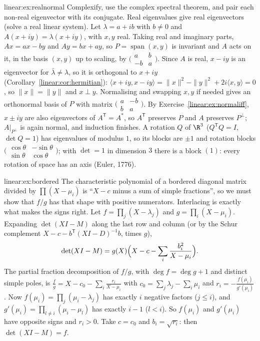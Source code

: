 \begin{solution}{linear:ex:realnormal}
\idea Complexify, use the complex spectral theorem, and pair each non-real eigenvector with its conjugate.
\writeup Real eigenvalues give real eigenvectors (solve a real linear system). Let $\lambda=a+ib$ with $b\ne0$ and
$A(x+iy)=\lambda(x+iy)$, with $x,y$ real. Taking real and imaginary parts, $Ax=ax-by$ and $Ay=bx+ay$, so $P=\operatorname{span}
(x,y)$ is invariant and $A$ acts on it, in the basis $(x,y)$ up to scaling, by $\bigl(\begin{smallmatrix}a&b\\-b&a
\end{smallmatrix}\bigr)$. Since $A$ is real, $x-iy$ is an eigenvector for $\bar\lambda\ne\lambda$, so it is orthogonal to
$x+iy$ (Corollary~\ref{linear:cor:hermitian}): $\langle x+iy,x-iy\rangle=\|x\|^2-\|y\|^2+2i\langle x,y\rangle=0$, so $\|x\|=\|y\|$
and $x\perp y$. Normalising and swapping $x,y$ if needed gives an orthonormal basis of $P$ with matrix $\bigl(\begin{smallmatrix}
a&-b\\b&a\end{smallmatrix}\bigr)$. By Exercise~\ref{linear:ex:normaliff}, $x\pm iy$ are also eigenvectors of $A^{\mathsf T}=A^*$, so
$A^{\mathsf T}$ preserves $P$ and $A$ preserves $P^\perp$; $A|_{P^\perp}$ is again normal, and induction finishes. A rotation
$Q$ of $\R^3$ ($Q^{\mathsf T}Q=I$, $\det Q=1$) has eigenvalues of modulus $1$, so its blocks are $\pm1$ and rotation blocks
$\bigl(\begin{smallmatrix}\cos\theta&-\sin\theta\\\sin\theta&\cos\theta\end{smallmatrix}\bigr)$; with $\det=1$ in dimension $3$
there is a block $(1)$: every rotation of space has an axis (Euler, 1776).
\end{solution}

\begin{solution}{linear:ex:bordered}
\idea The characteristic polynomial of a bordered diagonal matrix divided by $\prod(X-\mu_i)$ is ``$X-c$ minus a sum of
simple fractions'', so we must show that $f/g$ has that shape with positive numerators. Interlacing is exactly what makes the
signs right.
\writeup Let $f=\prod_j(X-\lambda_j)$ and $g=\prod_i(X-\mu_i)$. Expanding $\det(XI-M)$ along the last row and column (or by
the Schur complement $X-c-b^{\mathsf T}(XI-D)^{-1}b$, times $g$),
\[
\det(XI-M)=g(X)\Bigl(X-c-\sum_i\frac{b_i^2}{X-\mu_i}\Bigr).
\]
The partial fraction decomposition of $f/g$, with $\deg f=\deg g+1$ and distinct simple poles, is
$\frac fg=X-c_0-\sum_i\frac{r_i}{X-\mu_i}$ with $c_0=\sum_j\lambda_j-\sum_i\mu_i$ and $r_i=-\frac{f(\mu_i)}{g'(\mu_i)}$.
Now $f(\mu_i)=\prod_j(\mu_i-\lambda_j)$ has exactly $i$ negative factors ($j\le i$), and $g'(\mu_i)=\prod_{l\ne i}(\mu_i-\mu_l)$
has exactly $i-1$ ($l<i$). So $f(\mu_i)$ and $g'(\mu_i)$ have opposite signs and $r_i>0$. Take $c=c_0$ and $b_i=\sqrt{r_i}$:
then $\det(XI-M)=f$.
\end{solution}

